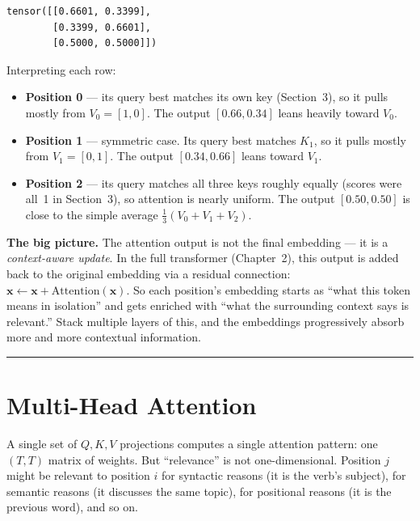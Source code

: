 \outputtag
\begin{lstlisting}
tensor([[0.6601, 0.3399],
        [0.3399, 0.6601],
        [0.5000, 0.5000]])
\end{lstlisting}

Interpreting each row:

\begin{itemize}
  \item \textbf{Position 0} --- its query best matches its own key (Section~3), so it pulls mostly from $V_0 = [1, 0]$. The output $[0.66, 0.34]$ leans heavily toward $V_0$.
  \item \textbf{Position 1} --- symmetric case. Its query best matches $K_1$, so it pulls mostly from $V_1 = [0, 1]$. The output $[0.34, 0.66]$ leans toward $V_1$.
  \item \textbf{Position 2} --- its query matches all three keys roughly equally (scores were all~1 in Section~3), so attention is nearly uniform. The output $[0.50, 0.50]$ is close to the simple average $\frac{1}{3}(V_0 + V_1 + V_2)$.
\end{itemize}

\textbf{The big picture.} The attention output is not the final embedding --- it is a \emph{context-aware update}. In the full transformer (Chapter~2), this output is added back to the original embedding via a residual connection: $\mathbf{x} \leftarrow \mathbf{x} + \mathrm{Attention}(\mathbf{x})$. So each position's embedding starts as ``what this token means in isolation'' and gets enriched with ``what the surrounding context says is relevant.'' Stack multiple layers of this, and the embeddings progressively absorb more and more contextual information.


\bigskip\hrule\bigskip

\section{Multi-Head Attention}

A single set of $Q, K, V$ projections computes a single attention pattern: one $(T, T)$ matrix of weights. But ``relevance'' is not one-dimensional. Position $j$ might be relevant to position $i$ for syntactic reasons (it is the verb's subject), for semantic reasons (it discusses the same topic), for positional reasons (it is the previous word), and so on.

